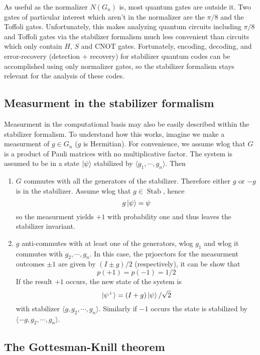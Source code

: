\documentclass[11pt,a4paper]{article}
\theoremstyle{definition}
\theoremstyle{plain}
\theoremstyle{remark}
\begin{document}
As useful as the normalizer $N(G_n)$ is, most quantum gates are outside it. Two gates of particular 
interest which aren't in the normalizer are the $\pi / 8$ and the Toffoli gates. 
Unfortunately, this makes analyzing quantum circuits including $\pi / 8$ and Toffoli gates via the stabilizer 
formalism much less convenient than circuits which only contain $H$, $S$ and CNOT gates. 
Fortunately, encoding, decoding, and error-recovery (detection + recovery) for stabilizer quantum codes can be 
accomplished using only normalizer gates, so the stabilizer formalism stays relevant for the analysis of these codes. 

\subsection{Measurment in the stabilizer formalism} 
Measurment in the computational basis may also be easily described within the stabilizer formalism. 
To understand how this works, imagine we make a measurment of $g \in G_n$ ($g$ is Hermitian).
For convenience, we assume wlog that $G$ is a product of Pauli matrices with no multiplicative factor. 
The system is assumed to be in a state $\ket{\psi}$ stabilized by $\langle g_1, \cdots, g_n\rangle$. Then 
\begin{enumerate}
  \item $G$ commutes with all the generators of the stabilizer. Therefore either $g$ or $-g$ is in the stabilizer. Assume wlog that $g \in \operatorname{Stab}$, hence 
  $$ g \ket{\psi} = \psi$$
  so the measurment yields $+1$ with probability one and thus leaves the stabilizer invariant. 

  \item $g$ anti-commutes with at least one of the generators, wlog $g_1$ and wlog it commutes with $g_2, \cdots, g_n$. In this case, 
  the prjoectors for the measurment outcomes $\pm 1$ are given by $(I \pm g) / 2$ (respectively), it can be show that 
  $$p(+1) = p(-1) = 1/2$$
  If the result $+1$ occurs, the new state of the system is 
  $$\ket{\psi^+} = (I + g) \ket{\psi} / \sqrt{2}$$
  with stabilizer $\langle g, g_2, \cdots, g_n\rangle$. Similarly if $-1$ occurs the state is stabilized by 
  $\langle - g, g_2, \cdots, g_n \rangle$. 
\end{enumerate}

\subsection{The Gottesman-Knill theorem} 
\end{document}
